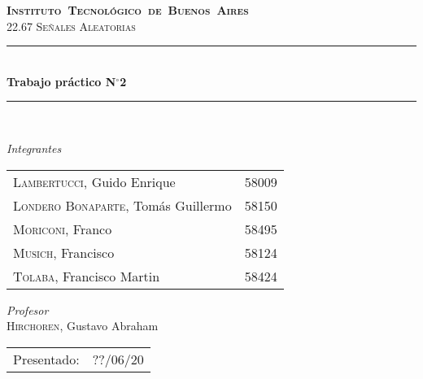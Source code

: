 \begin{titlepage}
\newcommand{\HRule}{\rule{\linewidth}{0.5mm}}
\center
\mbox{\textsc{\LARGE \bfseries {Instituto Tecnológico de Buenos Aires}}}\\[1.5cm]
\textsc{\Large 22.67 Señales Aleatorias}\\[0.5cm]


\HRule \\[0.6cm]
{ \Huge \bfseries Trabajo práctico N$^{\circ}$2}\\[0.4cm] 
\HRule \\[1.5cm]


{\large

\emph{Integrantes}\\
\vspace{3px}

\begin{tabular}{lr} 	
\textsc{Lambertucci}, Guido Enrique  & 58009 \\
\textsc{Londero Bonaparte}, Tomás Guillermo  & 58150 \\
\textsc{Moriconi}, Franco  &  58495\\
\textsc{Musich}, Francisco  & 58124\\
\textsc{Tolaba}, Francisco Martin & 58424\\
\end{tabular}

\vspace{20px}

\emph{Profesor}\\
\textsc{Hirchoren}, Gustavo Abraham \\
\vspace{3px}

\vspace{100px}

\begin{tabular}{ll}

Presentado: & ??/06/20\\

\end{tabular}

}

\vfill

\end{titlepage}

